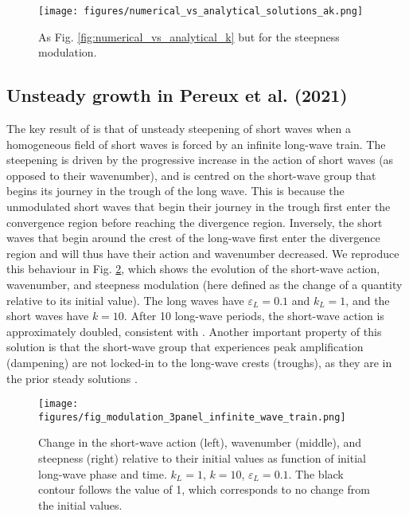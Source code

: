 \documentclass[lineno]{jfm}
\begin{document}
\begin{figure}
\centering
\texttt{[image: figures/numerical\_vs\_analytical\_solutions\_ak.png]}
\caption{
  As Fig. \ref{fig:numerical_vs_analytical_k} but for the steepness modulation.
}
\label{fig:numerical_vs_analytical_ak}
\end{figure}

\subsection{Unsteady growth in Pereux et al. (2021)}
\label{subsection:unsteady_growth}

The key result of \citet{peureux2021unsteady} is that of unsteady steepening of
short waves when a homogeneous field of short waves is forced by an infinite
long-wave train.
The steepening is driven by the progressive increase in the action of short
waves (as opposed to their wavenumber), and is centred on the short-wave group
that begins its journey in the trough of the long wave.
This is because the unmodulated short waves that begin their journey in the
trough first enter the convergence region before reaching the divergence region.
Inversely, the short waves that begin around the crest of the long-wave first
enter the divergence region and will thus have their action and wavenumber
decreased.
We reproduce this behaviour in Fig. \ref{fig:modulation_3panel_infinite}, which
shows the evolution of the short-wave action, wavenumber, and steepness
modulation (here defined as the change of a quantity relative to its initial value).
The long waves have $\varepsilon_L = 0.1$ and $k_L = 1$, and the short waves
have $k = 10$.
After 10 long-wave periods, the short-wave action is approximately doubled,
consistent with \citet{peureux2021unsteady}.
Another important property of this solution is that the short-wave group that
experiences peak amplification (dampening) are not locked-in to the long-wave
crests (troughs), as they are in the prior steady solutions
\citep{longuet1960changes,longuet1987propagation,zhang1990evolution}.

\begin{figure}
\centering
\texttt{[image: figures/fig\_modulation\_3panel\_infinite\_wave\_train.png]}
\caption{
  Change in the short-wave action (left), wavenumber (middle), and steepness (right)
  relative to their initial values as function of initial long-wave phase and time.
  $k_L = 1$, $k = 10$, $\varepsilon_L = 0.1$.
  The black contour follows the value of 1, which corresponds to no change
  from the initial values.
}
\label{fig:modulation_3panel_infinite}
\end{figure}
\end{document}

